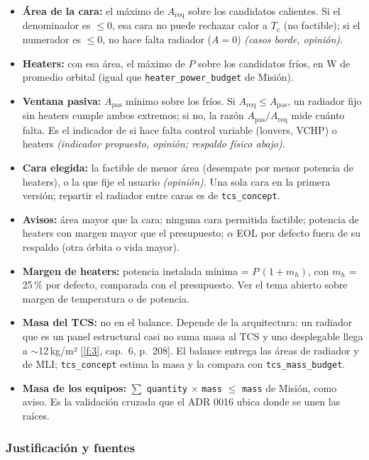 \documentclass[11pt,a4paper]{article}
\newcommand{\code}[1]{\texttt{#1}}
\newcommand{\op}[1]{\textcolor{opinion}{\textit{(#1)}}}
\newcommand{\f}[1]{\ref{f:#1}}
\begin{document}
\begin{itemize}
  \item \textbf{Área de la cara:} el máximo de $A_\mathrm{req}$ sobre los candidatos calientes. Si el denominador es $\le 0$, esa cara no puede rechazar calor a $T_\mathrm{c}$ (no factible); si el numerador es $\le 0$, no hace falta radiador ($A = 0$) \op{casos borde, opinión}.
  \item \textbf{Heaters:} con esa área, el máximo de $P$ sobre los candidatos fríos, en W de promedio orbital (igual que \code{heater\_power\_budget} de Misión).
  \item \textbf{Ventana pasiva:} $A_\mathrm{pas}$ mínimo sobre los fríos. Si $A_\mathrm{req} \le A_\mathrm{pas}$, un radiador fijo sin heaters cumple ambos extremos; si no, la razón $A_\mathrm{pas}/A_\mathrm{req}$ mide cuánto falta. Es el indicador de si hace falta control variable (louvers, VCHP) o heaters \op{indicador propuesto, opinión; respaldo físico abajo}.
  \item \textbf{Cara elegida:} la factible de menor área (desempate por menor potencia de heaters), o la que fije el usuario \op{opinión}. Una sola cara en la primera versión; repartir el radiador entre caras es de \code{tcs\_concept}.
  \item \textbf{Avisos:} área mayor que la cara; ninguna cara permitida factible; potencia de heaters con margen mayor que el presupuesto; $\alpha$ EOL por defecto fuera de su respaldo (otra órbita o vida mayor).
  \item \textbf{Margen de heaters:} potencia instalada mínima = $P\,(1 + m_h)$, con $m_h$ = 25\,\% por defecto, comparada con el presupuesto. Ver el tema abierto sobre margen de temperatura o de potencia.
  \item \textbf{Masa del TCS:} no en el balance. Depende de la arquitectura: un radiador que es un panel estructural casi no suma masa al TCS y uno desplegable llega a $\sim$12\,kg/m² [\f{3}, cap.~6, p.~208]. El balance entrega las áreas de radiador y de MLI; \code{tcs\_concept} estima la masa y la compara con \code{tcs\_mass\_budget}.
  \item \textbf{Masa de los equipos:} $\sum$ \code{quantity} $\times$ \code{mass} $\le$ \code{mass} de Misión, como aviso. Es la validación cruzada que el ADR 0016 ubica donde se unen las raíces.
\end{itemize}

\subsubsection*{Justificación y fuentes}
\end{document}

